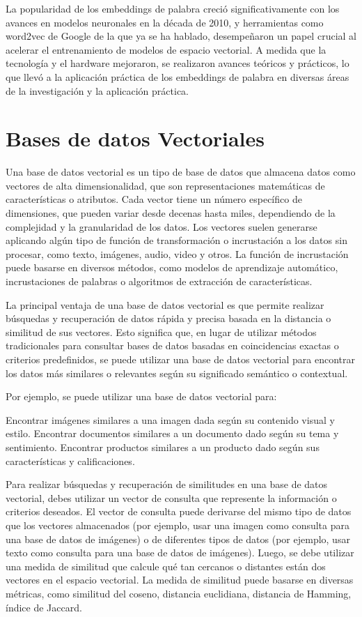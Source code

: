 La popularidad de los embeddings de palabra creció significativamente con los avances en modelos neuronales en la década de 2010, y herramientas como word2vec de Google de la que ya se ha hablado, desempeñaron un papel crucial al acelerar el entrenamiento de modelos de espacio vectorial. A medida que la tecnología y el hardware mejoraron, se realizaron avances teóricos y prácticos, lo que llevó a la aplicación práctica de los embeddings de palabra en diversas áreas de la investigación y la aplicación práctica.

\section{Bases de datos Vectoriales}

Una base de datos vectorial es un tipo de base de datos que almacena datos como vectores de alta dimensionalidad, que son representaciones matemáticas de características o atributos. Cada vector tiene un número específico de dimensiones, que pueden variar desde decenas hasta miles, dependiendo de la complejidad y la granularidad de los datos. Los vectores suelen generarse aplicando algún tipo de función de transformación o incrustación a los datos sin procesar, como texto, imágenes, audio, video y otros. La función de incrustación puede basarse en diversos métodos, como modelos de aprendizaje automático, incrustaciones de palabras o algoritmos de extracción de características\cite{MicrosoftVectorDatabase}.

La principal ventaja de una base de datos vectorial es que permite realizar búsquedas y recuperación de datos rápida y precisa basada en la distancia o similitud de sus vectores. Esto significa que, en lugar de utilizar métodos tradicionales para consultar bases de datos basadas en coincidencias exactas o criterios predefinidos, se puede utilizar una base de datos vectorial para encontrar los datos más similares o relevantes según su significado semántico o contextual.

Por ejemplo, se puede utilizar una base de datos vectorial para:

Encontrar imágenes similares a una imagen dada según su contenido visual y estilo.
Encontrar documentos similares a un documento dado según su tema y sentimiento.
Encontrar productos similares a un producto dado según sus características y calificaciones.

Para realizar búsquedas y recuperación de similitudes en una base de datos vectorial, debes utilizar un vector de consulta que represente la información o criterios deseados. El vector de consulta puede derivarse del mismo tipo de datos que los vectores almacenados (por ejemplo, usar una imagen como consulta para una base de datos de imágenes) o de diferentes tipos de datos (por ejemplo, usar texto como consulta para una base de datos de imágenes). Luego, se debe utilizar una medida de similitud que calcule qué tan cercanos o distantes están dos vectores en el espacio vectorial. La medida de similitud puede basarse en diversas métricas, como similitud del coseno, distancia euclidiana, distancia de Hamming, índice de Jaccard.

